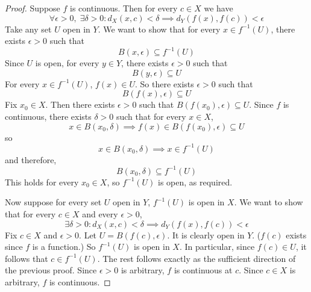 \begin{proof}
  Suppose $f$ is continuous. Then for every $c \in X$ we have
  \[
    \forall \epsilon > 0, \; \exists \delta > 0: d_X(x, c) < \delta \implies d_Y(f(x), f(c)) < \epsilon 
  \]
  Take any set $U$ open in $Y$. We want to show that for every $x \in f ^ {-1} (U)$, there exists $\epsilon > 0$ such that
  \[
    B(x, \epsilon) \subseteq f ^ {-1} (U)
  \]
  Since $U$ is open, for every $y \in Y$, there exists $\epsilon > 0$ such that
  \[
    B(y, \epsilon) \subseteq U
  \]
  For every $x \in f ^ {-1} (U)$, $f(x) \in U$. So there exists $\epsilon > 0$ such that
  \[
    B(f(x), \epsilon) \subseteq U
  \]
  Fix $x_0 \in X$. Then there exists $\epsilon > 0$ such that $B(f(x_0), \epsilon) \subseteq U$. Since $f$ is continuous, there exists $\delta > 0$ such that for every $x \in X$,
  \[
    x \in B(x_0, \delta) \implies f(x) \in B(f(x_0), \epsilon) \subseteq U
  \]
  so
  \[
    x \in B(x_0, \delta) \implies x \in f ^ {-1} (U)
  \]
  and therefore,
  \[
    B(x_0, \delta) \subseteq f ^ {-1} (U)
  \]
  This holds for every $x_0 \in X$, so $f ^ {-1} (U)$ is open, as required.

  Now suppose for every set $U$ open in $Y$, $f ^ {-1} (U)$ is open in $X$. We want to show that for every $c \in X$ and every $\epsilon > 0$,
  \[
    \exists \delta > 0: d_X(x, c) < \delta \implies d_Y(f(x), f(c)) < \epsilon
  \]
  Fix $c \in X$ and $\epsilon > 0$. Let $U = B(f(c), \epsilon)$. It is clearly open in $Y$. ($f(c)$ exists since $f$ is a function.) So $f ^ {-1} (U)$ is open in $X$. In particular, since $f(c) \in U$, it follows that $c \in f ^ {-1} (U)$. The rest follows exactly as the sufficient direction of the previous proof. Since $\epsilon > 0$ is arbitrary, $f$ is continuous at $c$. Since $c \in X$ is arbitrary, $f$ is continuous.
\end{proof}